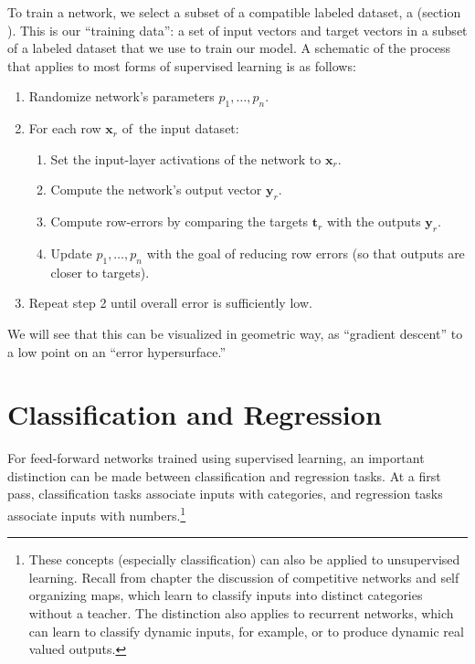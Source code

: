 To train a network, we select a subset of a compatible labeled dataset, a   (section ). This is our ``training data'': a set of input vectors and target vectors in a subset of a labeled dataset that we use to train our model. A schematic of the process that applies to most forms of supervised learning is as follows:
 \begin{enumerate}
\item Randomize network's parameters $p_1,\dots,p_n$.
\item For each row $\mathbf{x}_r$  of the input dataset:
\begin{enumerate}
\item Set the input-layer activations of the network to $\mathbf{x}_r$.
\item Compute the network's output vector $\mathbf{y}_r$. 
\item Compute row-errors by comparing the targets $\mathbf{t}_r$ with the outputs $\mathbf{y}_r$.
\item Update $p_1,\dots, p_n$ with the goal of reducing row errors (so that outputs are closer to targets). %
\end{enumerate}
\item Repeat step 2 until overall error is sufficiently low.
\end{enumerate}
	

We will see that this can be visualized in geometric way, as ``gradient descent'' to a low point on an ``error hypersurface.''


\section{Classification and Regression}\label{classificationRegression}

For feed-forward networks trained using supervised learning, an important distinction can be made between classification and regression tasks. At a first pass, classification tasks associate inputs with categories, and regression tasks associate inputs with numbers.\footnote{These concepts (especially classification) can also be applied to unsupervised learning. Recall from chapter  the discussion of competitive networks and self organizing maps, which learn to classify inputs into distinct categories without a teacher. The distinction also applies to recurrent networks, which can learn to classify  dynamic inputs, for example, or to produce dynamic real valued outputs.} 


